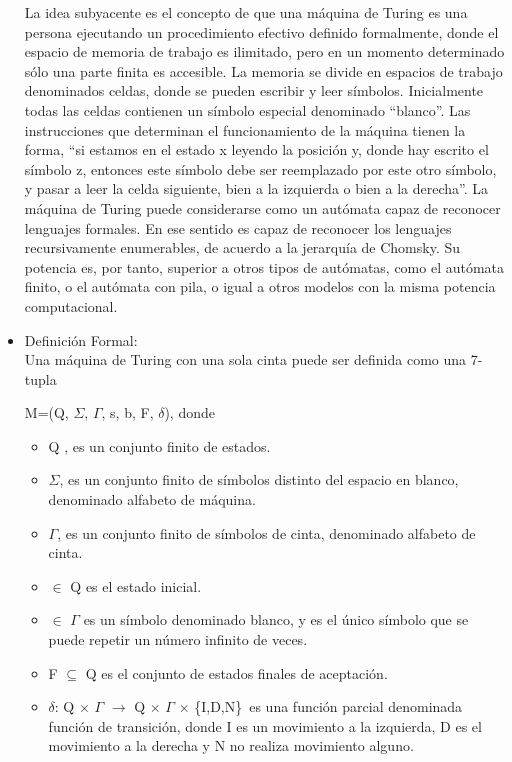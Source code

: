 \documentclass[12pt,a4paper,spanish]{book}
\begin{document}
\begin{itemize}
La idea subyacente es el concepto de que una m\'aquina de Turing es una persona ejecutando un procedimiento efectivo definido formalmente, donde el espacio de memoria de trabajo es ilimitado, pero en un momento determinado s\'olo una parte finita es accesible. La memoria se divide en espacios de trabajo denominados celdas, donde se pueden escribir y leer s\'imbolos. Inicialmente todas las celdas contienen un s\'imbolo especial denominado ``blanco''. Las instrucciones que determinan el funcionamiento de la m\'aquina tienen la forma, ``si estamos en el estado x leyendo la posici\'on y, donde hay escrito el s\'imbolo z, entonces este s\'imbolo debe ser reemplazado por este otro s\'imbolo, y pasar a leer la celda siguiente, bien a la izquierda o bien a la derecha''. La m\'aquina de Turing puede considerarse como un aut\'omata capaz de reconocer lenguajes formales. En ese sentido es capaz de reconocer los lenguajes recursivamente enumerables, de acuerdo a la jerarqu\'ia de Chomsky. Su potencia es, por tanto, superior a otros tipos de aut\'omatas, como el aut\'omata finito, o el aut\'omata con pila, o igual a otros modelos con la misma potencia computacional.\\
\item Definici\'on Formal:\\
\newline
Una m\'aquina de Turing con una sola cinta puede ser definida como una 7-tupla\\ 
\begin{center}
M=(Q, $\Sigma$, $\Gamma$, s, b, F, $\delta$), donde
\end{center}
\begin{itemize}
\item Q , es un conjunto finito de estados.
\item $\Sigma$, es un conjunto finito de s\'imbolos distinto del espacio en blanco, denominado alfabeto de m\'aquina.
\item $\Gamma$, es un conjunto finito de s\'imbolos de cinta, denominado alfabeto de cinta.
\item $\in$ Q es el estado inicial.
\item $\in$ $\Gamma$ es un s\'imbolo denominado blanco, y es el \'unico s\'imbolo que se puede repetir un n\'umero infinito de veces.
\item F $\subseteq$ Q es el conjunto de estados finales de aceptaci\'on.
\item $\delta$: Q $\times$ $\Gamma$ $\rightarrow$ Q $\times$ $\Gamma$ $\times$ \{I,D,N\}\, es una funci\'on parcial denominada funci\'on de transici\'on, donde I es un movimiento a la izquierda, D es el movimiento a la derecha y N no realiza movimiento alguno.

\end{itemize}
\end{itemize}
\end{document}
